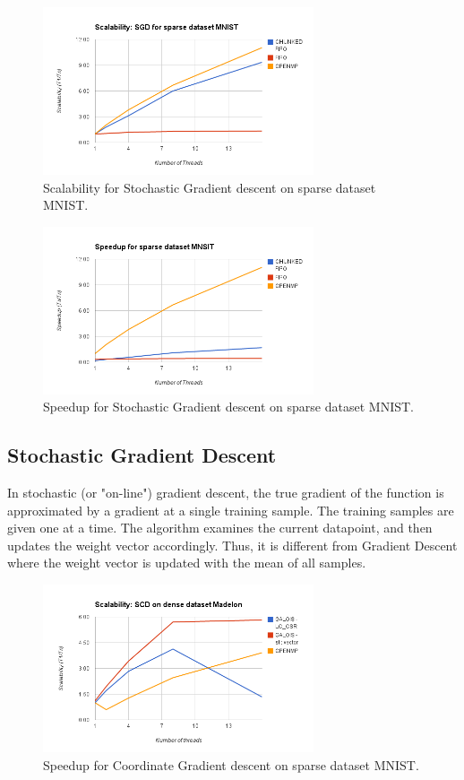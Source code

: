 \documentclass{sigplanconf}
\begin{document}
\begin{figure}[ht!]
\centering
\includegraphics[width=80mm]{sgd_scale_sparse.png}
\caption{Scalability for Stochastic Gradient descent on sparse dataset MNIST. }
\label{overflow}
\end{figure}


\begin{figure}[ht!]
\centering
\includegraphics[width=80mm]{sgd_speed_sparse.png}
\caption{Speedup for Stochastic Gradient descent on sparse dataset MNIST. }
\label{overflow}
\end{figure}




\subsection{Stochastic Gradient Descent}
In stochastic (or "on-line") gradient descent, the true gradient of the function is approximated by a gradient at a
single training sample. The training samples are given one at a time. The algorithm examines the
current datapoint, and then updates the weight vector accordingly. Thus, it is different from Gradient Descent where the weight
vector is updated with the mean of all samples.

\begin{figure}[ht!]
\centering
\includegraphics[width=80mm]{scd_scale_dense.png}
\caption{Speedup for Coordinate Gradient descent on sparse dataset MNIST. }
\label{overflow}
\end{figure}
\end{document}
